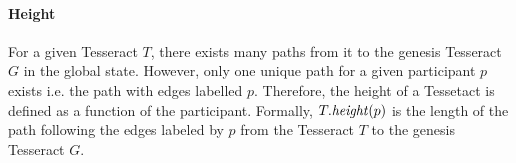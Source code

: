

\paragraph{\textbf{Height}}
For a given Tesseract $T$, there exists many paths from it to the genesis Tesseract $G$ in the global state. However, only one unique path for a given participant $p$ exists i.e. the path with edges labelled $p$. Therefore, the height of a Tessetact is defined as a function of the participant. Formally, $T.\mathit{height}(p)$ is the length of the path following the edges labeled by $p$ from the Tesseract $T$ to the genesis Tesseract $G$.




